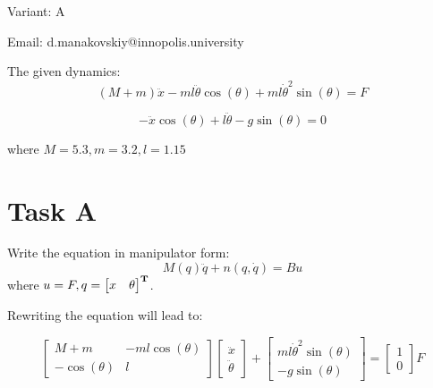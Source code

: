\documentclass[12pt,letterpaper]{article}
\begin{document}
Variant: A

Email: d.manakovskiy@innopolis.university

The given dynamics:
\begin{equation}
    \label{given:1}
    (M + m)\ddot x - ml \ddot \theta \cos(\theta) + ml \dot\theta^2 \sin(\theta) = F
\end{equation}

\begin{equation}
    \label{given:2}
    - \ddot x \cos(\theta) + l \ddot\theta - g\sin(\theta) = 0
\end{equation}

where $M = 5.3, m = 3.2, l = 1.15$


\section*{Task A}
\label{Q:A}
    Write the equation in manipulator form:
    \begin{equation*}
        M(q)\ddot q + n(q, \dot q) = Bu 
    \end{equation*}
    where $u = F, 
    q = \begin{bmatrix}
        x & \theta 
    \end{bmatrix}  ^\mathbf{T}$.
    
    Rewriting the equation will lead to:
    
    \begin{equation*}
        \begin{bmatrix}
            M+m & -ml\cos(\theta) \\ 
            -\cos(\theta) & l 
        \end{bmatrix}
        \begin{bmatrix}
            \ddot x \\ \ddot \theta 
        \end{bmatrix}
        +
        \begin{bmatrix}
            ml \dot \theta^2\sin(\theta)  \\ -g\sin(\theta) 
        \end{bmatrix}
        =
        \begin{bmatrix}
            1 \\ 0 
        \end{bmatrix}
        F
    \end{equation*}
\end{document}
